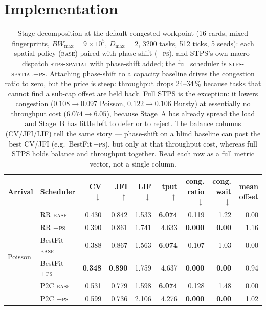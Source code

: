 \documentclass[letterpaper,twocolumn,10pt]{article}
\begin{document}
\section{Implementation}
\label{sec:impl}

\begin{table}[!t]
\centering
\caption{Stage decomposition at the default congested workpoint (16 cards, mixed fingerprints, $BW_{\max}\!=\!9\!\times\!10^{5}$, $D_{\max}\!=\!2$, 3200 tasks, 512 ticks, 5 seeds): each spatial policy (\textsc{base}) paired with phase-shift (\textsc{+ps}), and STPS's own macro-dispatch \textsc{stps-spatial} with phase-shift added; the full scheduler is \textsc{stps-spatial+ps}. Attaching phase-shift to a capacity baseline drives the congestion ratio to zero, but the price is steep: throughput drops 24--34\,\% because tasks that cannot find a sub-cap offset are held back. Full STPS is the exception: it lowers congestion ($0.108\!\to\!0.097$ Poisson, $0.122\!\to\!0.106$ Bursty) at essentially no throughput cost ($6.074\!\to\!6.05$), because Stage~A has already spread the load and Stage~B has little left to defer or to reject. The balance columns (CV/JFI/LIF) tell the same story --- phase-shift on a blind baseline can post the best CV/JFI (e.g.\ BestFit\,\textsc{+ps}), but only at that throughput cost, whereas full STPS holds balance and throughput together. Read each row as a full metric vector, not a single column.}
\label{tab:q2_phase}
\footnotesize
\setlength{\tabcolsep}{5pt}
\begin{tabular}{llrrrrrrr}
\toprule
Arrival & Scheduler & CV $\downarrow$ & JFI $\uparrow$ & LIF $\downarrow$ & tput $\uparrow$ & cong. ratio $\downarrow$ & cong. wait $\downarrow$ & mean offset \\
\midrule
\multirow{8}{*}{Poisson}
 & RR \textsc{base}             & 0.430 & 0.842 & 1.533 & \textbf{6.074} & 0.119 & 1.22 & 0.00 \\
 & RR \textsc{+ps}              & 0.390 & 0.861 & 1.741 & 4.633 & \textbf{0.000} & \textbf{0.00} & 1.16 \\
 & BestFit \textsc{base}        & 0.388 & 0.867 & 1.563 & \textbf{6.074} & 0.107 & 1.03 & 0.00 \\
 & BestFit \textsc{+ps}         & \textbf{0.348} & \textbf{0.890} & 1.759 & 4.637 & \textbf{0.000} & \textbf{0.00} & 0.94 \\
 & P2C \textsc{base}            & 0.531 & 0.779 & 1.598 & \textbf{6.074} & 0.128 & 1.48 & 0.00 \\
 & P2C \textsc{+ps}             & 0.599 & 0.736 & 2.106 & 4.276 & \textbf{0.000} & \textbf{0.00} & 1.02 \\

\end{tabular}
\end{table}
\end{document}

